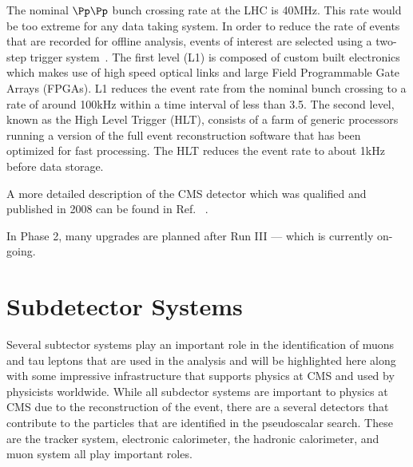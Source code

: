 The nominal $\Pp\Pp$ bunch crossing rate at the LHC is 40\unit{MHz}. This rate would be too extreme for any data taking system. In order to reduce the rate of events that are recorded for offline analysis, events of interest are selected using a two-step trigger system~\cite{Khachatryan:2016bia}.
The first level (L1) is composed of custom built electronics which makes use of
high speed optical links and large Field Programmable Gate Arrays (FPGAs). 
L1 reduces the event rate from the nominal bunch crossing to a rate of around
100\unit{kHz} within a time interval of less than 3.5\mus.
The second level, known as the High Level Trigger (HLT), consists of a farm of 
generic processors running a version of the full event reconstruction software that
 has been optimized for fast processing. The HLT reduces the event rate to about
1\unit{kHz} before data storage.


A more detailed description of the CMS detector which was qualified and published in 2008 can be found in Ref. ~\cite{Chatrchyan:2008zzk}.

In Phase 2, many upgrades are planned after Run III --- which is currently on-going. 


\section{Subdetector Systems}
Several subtector systems play an important role in the identification of muons and tau leptons that are used in the analysis and will be highlighted here along with some impressive infrastructure that supports physics at CMS and used by physicists worldwide. 
While all subdector systems are important to physics at CMS due to the reconstruction of the event, there are a several detectors that contribute to the particles that are identified in the pseudoscalar search. These are the tracker system, electronic calorimeter, the hadronic calorimeter, and muon system all play important roles. 

